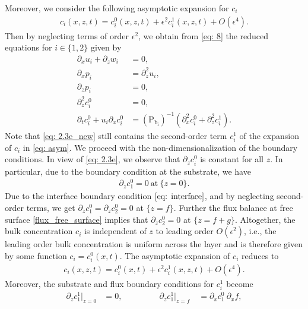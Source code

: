 \documentclass[11pt]{article}
\numberwithin{equation}{section}
\newtheorem{counter example}[theorem]{Counter Example}
\begin{document}
{Moreover, we consider the following asymptotic expansion for $c_i$ \cite{barthwal2023construction, conn2017stability}
\begin{align}\label{eq: asym}
c_i (x, z, t)=c_i^0(x, z, t)+\epsilon^2 c_i^1(x, z, t)+O(\epsilon^4).
\end{align}
Then by neglecting terms of order $\epsilon^2$, we obtain from \eqref{eq: 8} the reduced equations for $i \in \{1, 2\}$ given by 
\begin{subequations}\label{eq:reduced}
\begin{align}
    \partial_x u_i+\partial_z w_i&=0, \label{eq: 2.3a} \\
    \partial_x p_i&=\partial_z^2 u_i,\label{eq: 2.3b}\\
\partial_z p_i&=0, \label{eq: 2.3d}\\
    \partial_z^2 c_i^0&=0, \label{eq: 2.3e}\\
    \partial_t c_i^0+u_i\partial_x c_i^0&=(\mathrm{P_{b_i}})^{-1}\left(\partial_x^2 c_i^0+\partial_z^2 c_i^1\right). \label{eq: 2.3e_new} 
\end{align}
\end{subequations}
Note that \eqref{eq: 2.3e_new} still contains the second-order term  $c^1_i$ of the expansion of $c_i$ in \eqref{eq: asym}.
We proceed with the non-dimensionalization of the boundary conditions. In view of \eqref{eq: 2.3e}, we observe that $\partial_z c_i^0$ is constant for all $z$. In particular, due to the boundary condition at the substrate, we have
\begin{align}
  \partial_z c_1^0=0~\mathrm{at}~\{z=0\}. 
\end{align}
Due to the interface boundary condition $\eqref{eq: interface}$, and by neglecting second-order terms, we get $ \partial_z c_1^0=\partial_z c_2^0=0$ at $\{z=f\}$. Further the flux balance at free surface \eqref{flux_free_surface} implies that $ \partial_z c_2^0=0$ at $\{z=f+g\}$. Altogether, the bulk concentration $c_i$ is independent of $z$ to leading order $O(\epsilon^2)$, i.e., the leading order bulk concentration is uniform across the layer and is therefore given by some function $c_i=c_i^0(x,t)$. The asymptotic expansion of $c_i$ reduces to
\begin{align}\label{c_expansion}
c_i (x, z, t)=c_i^0(x, t)+\epsilon^2 c_i^1(x, z, t)+O(\epsilon^4).
\end{align}
Moreover, the substrate and flux boundary conditions for $c_i^1$ become
\begin{align}\label{eq: 2.7}
   \partial_z c_1^1\big|_{z=0}&=0,~~\qquad\qquad \partial_z c_1^1\big|_{z=f}\quad=\partial_x c_1^0~\partial_x f,\\

\end{align}}
\end{document}
